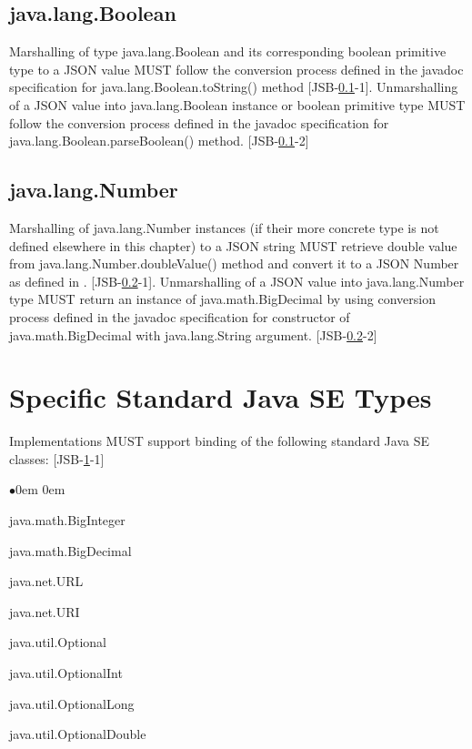 \subsection{java.lang.Boolean}
\label{subsec:boolean}
Marshalling of type java.lang.Boolean and its corresponding boolean primitive type to a JSON value 
MUST follow the conversion process defined in the javadoc specification for java.lang.Boolean.toString() method [JSB-\ref{subsec:boolean}-1]. 
Unmarshalling of a JSON value into java.lang.Boolean instance or boolean primitive type
MUST follow the conversion process defined in the javadoc specification for java.lang.Boolean.parseBoolean() method. [JSB-\ref{subsec:boolean}-2]

\subsection{java.lang.Number}
\label{subsec:abstractnumber}
Marshalling of java.lang.Number instances (if their more concrete type is not defined elsewhere in this chapter) to a JSON string 
MUST retrieve double value from java.lang.Number.doubleValue() method and convert it to a JSON Number as defined in . [JSB-\ref{subsec:abstractnumber}-1]. 
Unmarshalling of a JSON value into java.lang.Number type MUST return an instance of java.math.BigDecimal by using conversion process defined 
in the javadoc specification for constructor of java.math.BigDecimal with java.lang.String argument. [JSB-\ref{subsec:abstractnumber}-2]

\section{Specific Standard Java SE Types}
\label{sec:specific}
Implementations MUST support binding of the following standard Java SE classes: [JSB-\ref{sec:specific}-1]
\begin{list}{$\bullet$}{\parsep 0em  0em}
\item java.math.BigInteger
\item java.math.BigDecimal
\item java.net.URL
\item java.net.URI
\item java.util.Optional
\item java.util.OptionalInt
\item java.util.OptionalLong
\item java.util.OptionalDouble
\end{list}

